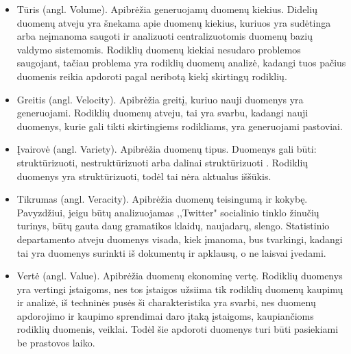 \documentclass{VUMIFPSkursinis}
\begin{document}
\begin{itemize}
    \item Tūris (angl. Volume). Apibrėžia generuojamų duomenų kiekius. Didelių duomenų atveju yra šnekama apie duomenų kiekius, kuriuos yra sudėtinga arba neįmanoma saugoti 
    ir analizuoti centralizuotomis duomenų bazių valdymo sistemomis. Rodiklių duomenų kiekiai nesudaro problemos saugojant, tačiau problema yra rodiklių duomenų analizė, 
    kadangi tuos pačius duomenis reikia apdoroti pagal neribotą kiekį skirtingų rodiklių.
    \item Greitis (angl. Velocity). Apibrėžia greitį, kuriuo nauji duomenys yra generuojami. Rodiklių duomenų atveju, tai yra svarbu, kadangi nauji duomenys, kurie gali 
    tikti skirtingiems rodikliams, yra generuojami pastoviai.
    \item Įvairovė (angl. Variety). Apibrėžia duomenų tipus. Duomenys gali būti: struktūrizuoti, nestruktūrizuoti arba dalinai struktūrizuoti \cite{zikopoulos2011understanding}. 
    Rodiklių duomenys yra struktūrizuoti, todėl tai nėra aktualus iššūkis.
    \item Tikrumas (angl. Veracity). Apibrėžia duomenų teisingumą ir kokybę. Pavyzdžiui, jeigu būtų analizuojamas ,,Twitter" socialinio tinklo žinučių turinys, būtų gauta
    daug gramatikos klaidų, naujadarų, slengo. 
    Statistinio departamento atveju duomenys visada, kiek įmanoma, bus tvarkingi, kadangi tai yra duomenys surinkti iš dokumentų ir apklausų, o ne laisvai įvedami.
    \item Vertė (angl. Value). Apibrėžia duomenų ekonominę vertę. Rodiklių duomenys yra vertingi įstaigoms, nes tos įstaigos užsiima tik rodiklių duomenų kaupimų ir analizė, iš techninės pusės
    ši charakteristika yra svarbi, nes duomenų apdorojimo ir kaupimo sprendimai daro įtaką įstaigoms, kaupiančioms rodiklių duomenis, veiklai. 
    Todėl šie apdoroti duomenys turi būti pasiekiami be prastovos laiko.
\end{itemize}\par
\end{document}
